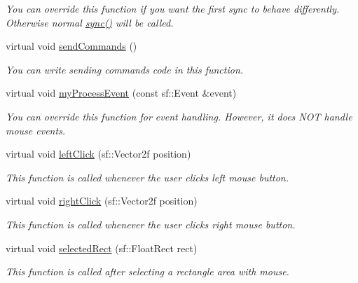 \begin{DoxyCompactItemize}
\begin{DoxyCompactList}\small\item\em You can override this function if you want the first sync to behave differently. Otherwise normal \hyperlink{classGame_aab44617eccac431efb47e8737740b9f6}{sync()} will be called. \end{DoxyCompactList}\item 
virtual void \hyperlink{classGame_adcfb81710141ae68ff1e4571aaed2555}{send\+Commands} ()
\begin{DoxyCompactList}\small\item\em You can write sending commands code in this function. \end{DoxyCompactList}\item 
virtual void \hyperlink{classGame_a0e97a7944c35890bfec2910074cf5f23}{my\+Process\+Event} (const sf\+::\+Event \&event)
\begin{DoxyCompactList}\small\item\em You can override this function for event handling. However, it does N\+OT handle mouse events. \end{DoxyCompactList}\item 
virtual void \hyperlink{classGame_a45559f72d8a850d2acc62f6439400e7e}{left\+Click} (sf\+::\+Vector2f position)
\begin{DoxyCompactList}\small\item\em This function is called whenever the user clicks left mouse button. \end{DoxyCompactList}\item 
virtual void \hyperlink{classGame_a1b9835bd630043b37243c43b6d46f73a}{right\+Click} (sf\+::\+Vector2f position)
\begin{DoxyCompactList}\small\item\em This function is called whenever the user clicks right mouse button. \end{DoxyCompactList}\item 
virtual void \hyperlink{classGame_a4f239a4d2ac903b55620b7f52e4d2fe0}{selected\+Rect} (sf\+::\+Float\+Rect rect)
\begin{DoxyCompactList}\small\item\em This function is called after selecting a rectangle area with mouse. \end{DoxyCompactList}\end{DoxyCompactItemize}
